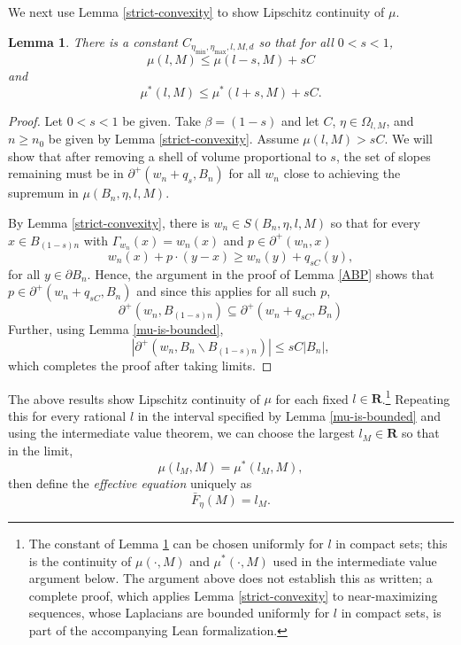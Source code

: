 \documentclass[12pt]{amsart}
\newcommand{\R}{\mathbf{R}}
\newtheorem{lemma}[theorem]{Lemma}
\begin{document}
We next use Lemma \ref{strict-convexity} to show Lipschitz continuity of $\mu$.
\begin{lemma}\label{continuity} 
There is a constant $C_{\eta_{\min}, \eta_{\max}, l, M, d}$ so that for all $0 < s < 1$,
\[
\mu(l, M) \leq  \mu(l-s, M)+  s C
\]
and
\[
\mu^*(l,M) \leq \mu^*(l+s,M) + sC. %
\]
\end{lemma}

\begin{proof}
Let $0 < s < 1$ be given. Take $\beta = (1-s)$ and let $C$, $\eta \in \Omega_{l,M}$, and $n \geq n_0$ be given by Lemma \ref{strict-convexity}. Assume $\mu(l,M) > s C$. We will show that after removing a shell of volume proportional to $s$, the set of slopes remaining must be in $\partial^+(w_n + q_s, B_n)$ for all $w_n$ close to achieving the supremum in  $\mu(B_{n}, \eta, l, M)$.

By Lemma \ref{strict-convexity}, there is $w_n \in S(B_{n}, \eta, l, M)$ so that for every $x \in B_{(1-s) n}$ with $\Gamma_{w_n}(x) = w_n(x)$ 
and $p \in \partial^+(w_n, x)$ 
\begin{equation}
w_n(x) + p \cdot(y -x)  \geq w_n(y) + q_{s C}(y), 
\end{equation}
for all $y \in \partial B_{n}$. 
Hence, the argument in the proof of Lemma \ref{ABP} shows that $p \in \partial^+(w_n + q_{s C},B_n)$
and since this applies for all such $p$, 
\[
\partial^+(w_n, B_{(1-s)n}) \subseteq \partial^+(w_n + q_{sC}, B_n) 
\]
Further, using Lemma \ref{mu-is-bounded}, 
\[
|\partial^+(w_n, B_n \backslash B_{(1-s)n})| \leq   s C |B_n|, 
\]
which completes the proof after taking limits.
\end{proof}

The above results show Lipschitz continuity of $\mu$ for each fixed $l \in \R$.\footnote{The constant of Lemma \ref{continuity} can be chosen uniformly for $l$ in compact sets; this is the continuity of $\mu(\cdot, M)$ and $\mu^*(\cdot, M)$ used in the intermediate value argument below. The argument above does not establish this as written; a complete proof, which applies Lemma \ref{strict-convexity} to near-maximizing sequences, whose Laplacians are bounded uniformly for $l$ in compact sets, is part of the accompanying Lean formalization.} Repeating this for every rational $l$ %
in the interval specified by Lemma \ref{mu-is-bounded} and using the intermediate value theorem, we can choose the largest $l_M \in \R$ so that in the limit, 
\[
\mu(l_M, M) = \mu^*(l_M,M),
\]
then define the {\it effective equation} uniquely as
\[
\bar{F}_{\eta}(M) = l_M. 
\]
\end{document}
